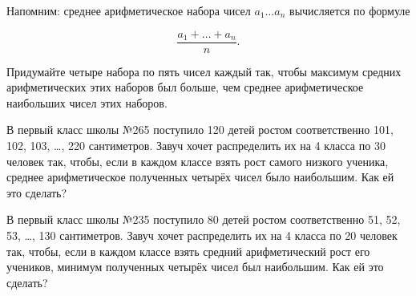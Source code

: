﻿
\noindent Напомним: среднее арифметическое набора чисел $a_1 \ldots a_n$ вычисляется по формуле

$$\frac{a_1 + \ldots + a_n}{n}.$$

\begin{enumerate}
\itA Придумайте четыре набора по пять чисел каждый так, чтобы максимум средних арифметических этих наборов был больше, чем среднее арифметическое наибольших чисел этих наборов.

\itB В первый класс школы №265 поступило 120 детей ростом соответственно 101, 102, 103, …, 220 сантиметров. Завуч хочет распределить их на 4 класса по 30 человек так, чтобы, если в каждом классе взять рост самого низкого ученика, среднее арифметическое полученных четырёх чисел было наибольшим. Как ей это сделать?

\itC В первый класс школы №235 поступило 80 детей ростом соответственно 51, 52, 53, …, 130 сантиметров. Завуч хочет распределить их на 4 класса по 20 человек так, чтобы, если в каждом классе взять средний арифметический рост его учеников, минимум полученных четырёх чисел был наибольшим. Как ей это сделать?
\end{enumerate}